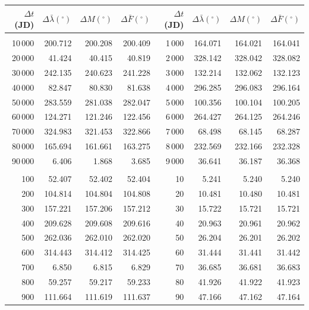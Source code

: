 \clearpage
\begin{table}[!h]
\vspace{0.25cm}
\centering
\begin{tabular}{rrrr|rrrr}
$\Delta t$(JD)& $\Delta\bar{\lambda}(^\circ)$ &  $\Delta M(^\circ)$ & $\Delta \bar{F}(^\circ)$& $\Delta t$(JD) & $\Delta\bar{\lambda}(^\circ)$ & $\Delta M(^\circ)$ 
&$\Delta \bar{F}(^\circ)$\\ \hline
&&&&&&&\\[-1.75ex]
10\,000 & 200.712 & 200.208 & 200.409 & 1\,000 & 164.071 & 164.021 & 164.041\\
20\,000 &  41.424 &  40.415 &  40.819 & 2\,000 & 328.142 & 328.042 & 328.082\\
30\,000 & 242.135 & 240.623 & 241.228 & 3\,000 & 132.214 & 132.062 & 132.123\\
40\,000 &  82.847 &  80.830 &  81.638 & 4\,000 & 296.285 & 296.083 & 296.164\\
50\,000 & 283.559 & 281.038 & 282.047 & 5\,000 & 100.356 & 100.104 & 100.205\\
60\,000 & 124.271 & 121.246 & 122.456 & 6\,000 & 264.427 & 264.125 & 264.246\\
70\,000 & 324.983 & 321.453 & 322.866 & 7\,000 &  68.498 &  68.145 &  68.287\\
80\,000 & 165.694 & 161.661 & 163.275 & 8\,000 & 232.569 & 232.166 & 232.328\\
90\,000 &   6.406 &   1.868 &   3.685 & 9\,000 &  36.641 &  36.187 &  36.368\\
&&&&&&&\\
100 &  52.407 &  52.402 &  52.404 & 10 &   5.241 &   5.240 &   5.240\\
200 & 104.814 & 104.804 & 104.808 & 20 &  10.481 &  10.480 &  10.481\\
300 & 157.221 & 157.206 & 157.212 & 30 &  15.722 &  15.721 &  15.721\\
400 & 209.628 & 209.608 & 209.616 & 40 &  20.963 &  20.961 &  20.962\\
500 & 262.036 & 262.010 & 262.020 & 50 &  26.204 &  26.201 &  26.202\\
600 & 314.443 & 314.412 & 314.425 & 60 &  31.444 &  31.441 &  31.442\\
700 &   6.850 &   6.815 &   6.829 & 70 &  36.685 &  36.681 &  36.683\\
800 &  59.257 &  59.217 &  59.233 & 80 &  41.926 &  41.922 &  41.923\\
900 & 111.664 & 111.619 & 111.637 & 90 &  47.166 &  47.162 &  47.164\\

\end{tabular}
\end{table}
